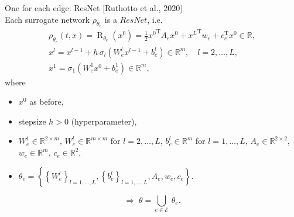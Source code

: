 \documentclass[9pt]{beamer}
\begin{document}
\begin{frame}{One for each edge: ResNet}
    \vspace{-1\baselineskip}\hfill{\tiny{[Ruthotto et al., 2020]}} \\
    Each surrogate network $\rho_{\theta_e}$ is a $ResNet$, i.e.  \\
    \begin{equation*} 
        \begin{gathered}
            \rho_{\theta_e} \left(t, x \right) = \operatorname{R}_{\theta_e}\left(x^0\right) = \frac{1}{2} {x^0}^{\mathrm{T}} A_e x^0 + {x^{L}}^{\mathrm{T}} w_e + c^{\mathrm{T}}_e x^0 \in \mathbb{R}, \\
            x^l = x^{l-1} + h \, \sigma_l\left(W^l_e x^{l-1} + b^l_e\right) \in \mathbb{R}^m, \quad l = 2, \ldots, L, \\
            x^1 = \sigma_1\left(W^1_e x^{0} + b^1_e\right) \in \mathbb{R}^m,
        \end{gathered} 
    \end{equation*}
    where \\
    \begin{itemize}
        \item $x^0$ as before, 
        \item stepsize $h > 0$ (hyperparameter),
        \item $W^1_e \in \mathbb{R}^{2 \times m}$, $W^l_e \in \mathbb{R}^{m \times m}$ for $l = 2, \ldots, L$, $b^l_e \in \mathbb{R}^{m}$ for $l = 1, \ldots, L$, $A_e \in \mathbb{R}^{2 \times 2}$, $w_e \in \mathbb{R}^m$, $c_e \in \mathbb{R}^2$, 
        \item $\theta_e = \left\{ \left\{ W^l_e \right\}_{l = 1, \ldots, L}, \left\{ b^l_e \right\}_{l = 1, \ldots, L}, A_e, w_e, c_e \right\}$.
    \end{itemize}

    \begin{equation*}
        \Rightarrow \; \theta = \bigcup_{e \in \mathcal{E}} \ \theta_e.
    \end{equation*}
\end{frame}
\end{document}
